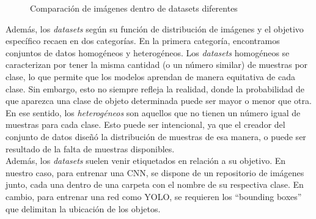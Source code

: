 \begin{figure}
    \centering
    \qquad
    \caption{Comparación de imágenes dentro de datasets diferentes}%
    \label{fig:combined}
\end{figure}
Además, los \textit{datasets} según su función de distribución de imágenes y 
el objetivo específico recaen en dos categorías. En la primera categoría, 
encontramos conjuntos de datos homogéneos y heterogéneos. Los \textit{datasets} 
homogéneos se caracterizan por 
tener la misma cantidad (o un número similar) de muestras por clase, lo que 
permite que los modelos aprendan de manera equitativa de cada clase. Sin embargo, 
esto no siempre refleja la realidad, donde la probabilidad de que aparezca una 
clase de objeto determinada puede ser mayor o menor que otra.
\\

En ese sentido, los \textit{heterogéneos} son aquellos que no tienen un 
número igual de muestras para cada clase. Esto puede ser intencional, ya que el 
creador del conjunto de datos diseñó la distribución de muestras de esa manera, o 
puede ser resultado de la falta de muestras disponibles.
\\

Además, los \textit{datasets} suelen venir etiquetados en relación a su objetivo. 
En nuestro caso, para entrenar una CNN, se dispone de un repositorio de imágenes 
junto, cada una dentro de una carpeta con el nombre de su respectiva clase. En 
cambio, para entrenar una red como YOLO, se requieren los ``bounding boxes'' que 
delimitan la ubicación de los objetos.
\\

